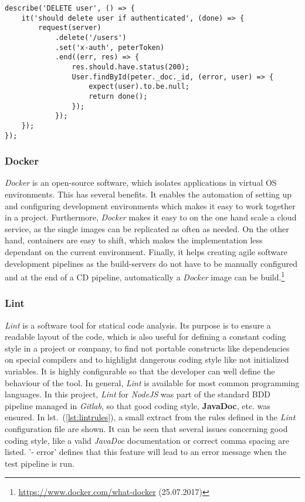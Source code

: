 \begin{lstlisting}[caption={Example of BDD testing for a user deleting himself from the database.}, label=lst:deleteuser]
describe('DELETE user', () => {
	it('should delete user if authenticated', (done) => {
		request(server)
			.delete('/users')
			.set('x-auth', peterToken)
			.end((err, res) => {
				res.should.have.status(200);
				User.findById(peter._doc._id, (error, user) => {
					expect(user).to.be.null;
					return done();
				});
			});
	});
});
\end{lstlisting}

\subsubsection{Docker}
\label{subsubsec:docker}
\textit{Docker} is an open-source software, which isolates applications in virtual OS environments. This has several benefits. It enables the automation of setting up and configuring development environments which makes it easy to work together in a project. Furthermore, \textit{Docker} makes it easy to on the one hand scale a cloud service, as the single images can be replicated as often as needed. On the other hand, containers are easy to shift, which makes the implementation less dependant on the current environment. Finally, it helps creating agile software development pipelines as the build-servers do not have to be manually configured and at the end of a CD pipeline, automatically a \textit{Docker} image can be build.\footnote{\url{https://www.docker.com/what-docker} (25.07.2017)}

\subsubsection{Lint}
\label{subsubsec:lint}
\textit{Lint} is a software tool for statical code analysis. Its purpose is to ensure a readable layout of the code, which is also useful for defining a constant coding style in a project or company, to find not portable constructs like dependencies on special compilers and to highlight dangerous coding style like not initialized variables. It is highly configurable so that the developer can well define the behaviour of the tool. In general, \textit{Lint} is available for most common programming languages.\newline\newline
In this project, \textit{Lint} for \textit{NodeJS} was part of the standard BDD pipeline managed in \textit{Gitlab}, so that good coding style, \textbf{JavaDoc}, etc. was ensured. In lst.\ (\ref{lst:lintrules}), a small extract from the rules defined in the \textit{Lint} configuration file are shown. It can be seen that several issues concerning good coding style, like a valid \textit{JavaDoc} documentation or correct comma spacing are listed. '- error' defines that this feature will lead to an error message when the test pipeline is run.

